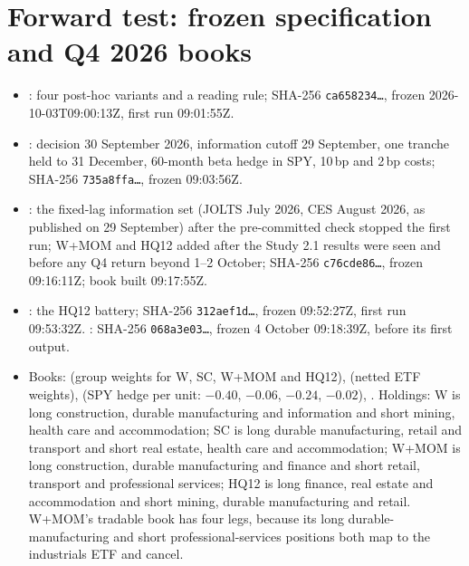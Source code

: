 \documentclass[11pt,letterpaper]{article}
\begin{document}
\section{Forward test: frozen specification and Q4 2026 books}\label{app:forward}
\begin{itemize}
  \item {}: four post-hoc variants and a reading rule; SHA-256 \texttt{ca658234\ldots}, frozen 2026-10-03T09:00:13Z, first run 09:01:55Z. %
  \item {}: decision 30 September 2026, information cutoff 29 September, one tranche held to 31 December, 60-month beta hedge in SPY, 10\,bp and 2\,bp costs; SHA-256 \texttt{735a8ffa\ldots}, frozen 09:03:56Z. %
  \item {}: the fixed-lag information set (JOLTS July 2026, CES August 2026, as published on 29 September) after the pre-committed check stopped the first run; W+MOM and HQ12 added after the Study 2.1 results were seen and before any Q4 return beyond 1--2 October; SHA-256 \texttt{c76cde86\ldots}, frozen 09:16:11Z; book built 09:17:55Z. %
  \item {}: the HQ12 battery; SHA-256 \texttt{312aef1d\ldots}, frozen 09:52:27Z, first run 09:53:32Z. : SHA-256 \texttt{068a3e03\ldots}, frozen 4 October 09:18:39Z, before its first output. %
  \item Books:  (group weights for W, SC, W+MOM and HQ12),  (netted ETF weights),  (SPY hedge per unit: $-0.40$, $-0.06$, $-0.24$, $-0.02$), . %
  Holdings: W is long construction, durable manufacturing and information and short mining, health care and accommodation; %
  SC is long durable manufacturing, retail and transport and short real estate, health care and accommodation; W+MOM is long construction, durable manufacturing and finance and short retail, transport and professional services; %
  HQ12 is long finance, real estate and accommodation and short mining, durable manufacturing and retail. %
  W+MOM's tradable book has four legs, because its long durable-manufacturing and short professional-services positions both map to the industrials ETF and cancel. %

\end{itemize}
\end{document}
